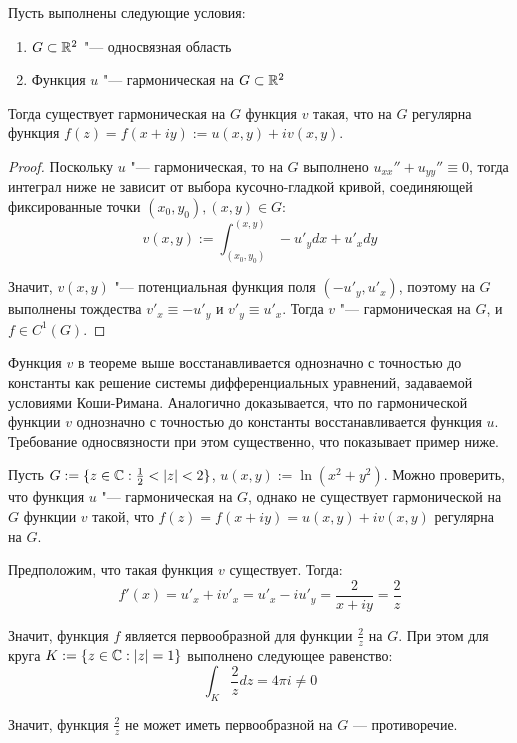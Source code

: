 \begin{proposition}
	Пусть выполнены следующие условия:
	\begin{enumerate}
		\item $G \subset \mathbb{R}^2$ "--- односвязная область
		\item Функция $u$ "--- гармоническая на $G \subset \mathbb{R}^2$
	\end{enumerate}
	
	Тогда существует гармоническая на $G$ функция $v$ такая, что на $G$ регулярна функция $f(z) = f(x + iy) := u(x, y) + iv(x, y)$.
\end{proposition}

\begin{proof}
	Поскольку $u$ "--- гармоническая, то на $G$ выполнено $u_{xx}'' + u_{yy}'' \equiv 0$, тогда интеграл ниже не зависит от выбора кусочно-гладкой кривой, соединяющей фиксированные точки $(x_0, y_0), (x, y) \in G$:
	\[v(x, y) := \int_{(x_0, y_0)}^{(x, y)}-u'_ydx + u'_xdy\]
	
	Значит, $v(x, y)$ "--- потенциальная функция поля $(-u'_y, u'_x)$, поэтому на $G$ выполнены тождества $v'_x \equiv -u'_y$ и $v'_y \equiv u'_x$. Тогда $v$ "--- гармоническая на $G$, и $f \in C^1(G)$.
\end{proof}

\begin{note}
	Функция $v$ в теореме выше восстанавливается однозначно с точностью до константы как решение системы дифференциальных уравнений, задаваемой условиями Коши-Римана. Аналогично доказывается, что по гармонической функции $v$ однозначно с точностью до константы восстанавливается функция $u$. Требование односвязности при этом существенно, что показывает пример ниже.
\end{note}

\begin{example}
	Пусть $G := \{z \in \mathbb{C} : \frac12 < |z| < 2\}$, $u(x, y) := \ln(x^2 + y^2)$. Можно проверить, что функция $u$ "--- гармоническая на $G$, однако не существует гармонической на $G$ функции $v$ такой, что $f(z) = f(x + iy) = u(x, y) + iv(x, y)$ регулярна на $G$.
	
	Предположим, что такая функция $v$ существует. Тогда:
	\[f'(x) = u'_x + iv'_x = u'_x - iu'_y = \frac{2}{x + iy} = \frac 2z\]
	
	Значит, функция $f$ является первообразной для функции $\frac 2z$ на $G$. При этом для круга $K := \{z \in \mathbb{C}: |z| = 1\}$ выполнено следующее равенство:
	\[\int_{K} \frac 2zdz = 4\pi i \ne 0\]
	
	Значит, функция $\frac2z$ не может иметь первообразной на $G$ --- противоречие.
\end{example}

